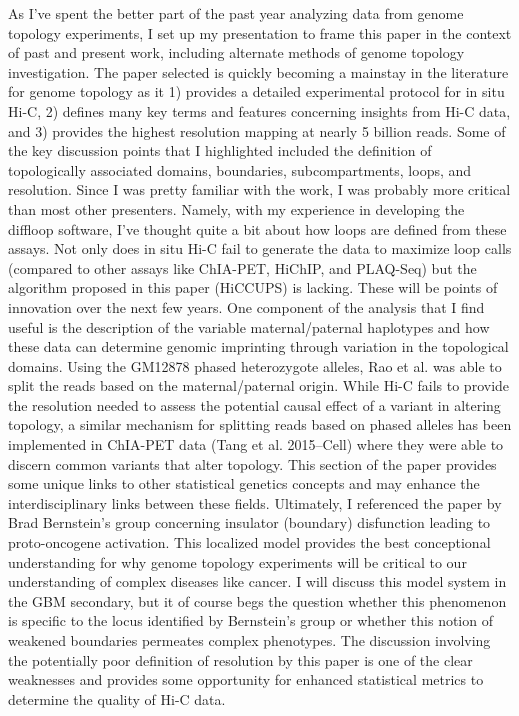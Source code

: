 \documentclass[12pt]{article}
\begin{document}
\begin{addmargin}[6.5mm]{4mm}  
As I've spent the better part of the past year analyzing data from genome topology experiments, I set up my presentation to frame this paper in the context of past and present work, including alternate methods of genome topology investigation. The paper selected is quickly becoming a mainstay in the literature for genome topology as it 1) provides a detailed experimental protocol for in situ Hi-C, 2) defines many key terms and features concerning insights from Hi-C data, and 3) provides the highest resolution mapping at nearly 5 billion reads. Some of the key discussion points that I highlighted included the definition of topologically associated domains, boundaries, subcompartments, loops, and resolution. \newline \newline Since I was pretty familiar with the work, I was probably more critical than most other presenters. Namely, with my experience in developing the diffloop software, I've thought quite a bit about how loops are defined from these assays. Not only does in situ Hi-C fail to generate the data to maximize loop calls (compared to other assays like ChIA-PET, HiChIP, and PLAQ-Seq) but the algorithm proposed in this paper (HiCCUPS) is lacking. These will be points of innovation over the next few years. \newline \newline One component of the analysis that I find useful is the description of the variable maternal/paternal haplotypes and how these data can determine genomic imprinting through variation in the topological domains. Using the GM12878 phased heterozygote alleles, Rao et al. was able to split the reads based on the maternal/paternal origin. While Hi-C fails to provide the resolution needed to assess the potential causal effect of a variant in altering topology, a similar mechanism for splitting reads based on phased alleles has been implemented in ChIA-PET data (Tang et al. 2015--Cell) where they were able to discern common variants that alter topology. This section of the paper provides some unique links to other statistical genetics concepts and may enhance the interdisciplinary links between these fields. \newline \newline Ultimately, I referenced the paper by Brad Bernstein's group concerning insulator (boundary) disfunction leading to proto-oncogene activation. This localized model provides the best conceptional understanding for why genome topology experiments will be critical to our understanding of complex diseases like cancer. I will discuss this model system in the GBM secondary, but it of course begs the question whether this phenomenon is specific to the locus identified by Bernstein's group or whether this notion of weakened boundaries permeates complex phenotypes. \newline \newline The discussion involving the potentially poor definition of resolution by this paper is one of the clear weaknesses and provides some opportunity for enhanced statistical metrics to determine the quality of Hi-C data. 
\end{addmargin}
\end{document}
